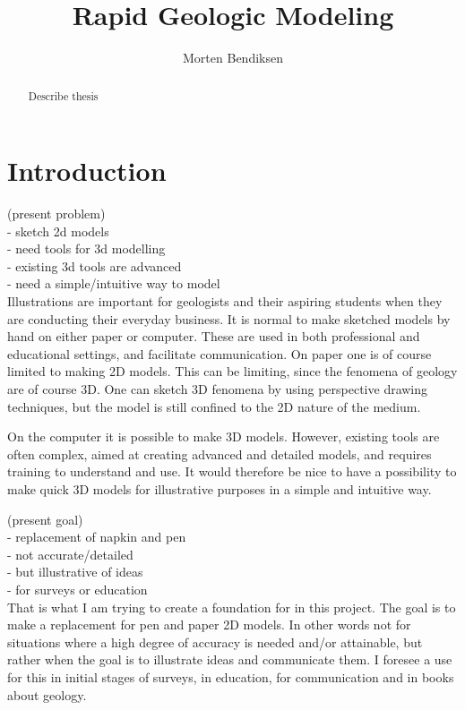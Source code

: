 \documentclass[a4paper,10pt]{article}
\title{Rapid Geologic Modeling}
\author{Morten Bendiksen}
\begin{document}
\maketitle

\begin{abstract}
Describe thesis
\end{abstract}

\newpage

\tableofcontents 

\newpage


\section{Introduction}

(present problem)\\
	- sketch 2d models\\
	- need tools for 3d modelling\\
	- existing 3d tools are advanced\\
	- need a simple/intuitive way to model\\
Illustrations are important for geologists and their aspiring students when they are conducting their everyday business. It is normal to make sketched models by hand on either paper or computer. These are used in both professional and educational settings, and facilitate communication. On paper one is of course limited to making 2D models. This can be limiting, since the fenomena of geology are of course 3D. One can sketch 3D fenomena by using perspective drawing techniques, but the model is still confined to the 2D nature of the medium.

On the computer it is possible to make 3D models. However, existing tools are often complex, aimed at creating advanced and detailed models, and requires training to understand and use. It would therefore be nice to have a possibility to make quick 3D models for illustrative purposes in a simple and intuitive way.


(present goal)\\
	- replacement of napkin and pen\\
	- not accurate/detailed\\
	- but illustrative of ideas\\
	- for surveys or education\\
That is what I am trying to create a foundation for in this project. The goal is to make a replacement for pen and paper 2D models. In other words not for situations where a high degree of accuracy is needed and/or attainable, but rather when the goal is to illustrate ideas and communicate them. I foresee a use for this in initial stages of surveys, in education, for communication and in books about geology.
\end{document}
